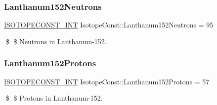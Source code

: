 \subsubsection{\texorpdfstring{Lanthanum152\+Neutrons}{Lanthanum152Neutrons}}
{\footnotesize\ttfamily \mbox{\hyperlink{group___isotope_const-_macros_ga5f18360b3e99483a35c32d789e62621c}{I\+S\+O\+T\+O\+P\+E\+C\+O\+N\+S\+T\+\_\+\+I\+NT}} Isotope\+Const\+::\+Lanthanum152\+Neutrons = 95}

\$ \$ Neutrons in Lanthanum-\/152. \mbox{\label{group___isotope_const-_lanthanum-_la152_ga088032506273e4666a02e66b5584bdae}} 
\subsubsection{\texorpdfstring{Lanthanum152\+Protons}{Lanthanum152Protons}}
{\footnotesize\ttfamily \mbox{\hyperlink{group___isotope_const-_macros_ga5f18360b3e99483a35c32d789e62621c}{I\+S\+O\+T\+O\+P\+E\+C\+O\+N\+S\+T\+\_\+\+I\+NT}} Isotope\+Const\+::\+Lanthanum152\+Protons = 57}

\$ \$ Protons in Lanthanum-\/152. 